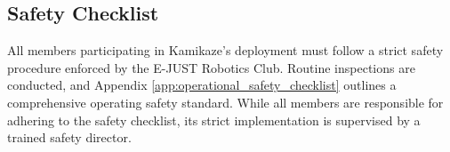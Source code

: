 \subsection{Safety Checklist}

All members participating in Kamikaze’s deployment must follow a strict safety procedure enforced by the E-JUST Robotics Club. Routine inspections are conducted, and Appendix \ref{app:operational_safety_checklist} outlines a comprehensive operating safety standard. While all members are responsible for adhering to the safety checklist, its strict implementation is supervised by a trained safety director.
